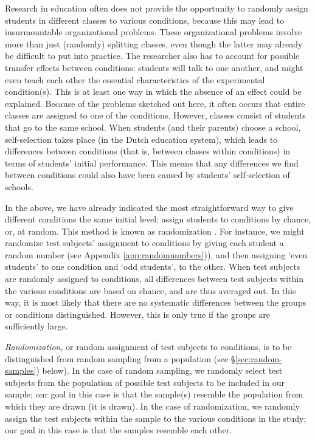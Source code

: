 \documentclass[
]{book}
\begin{document}
Research in education often does not provide the opportunity to randomly assign students in different classes to various conditions, because this may lead to insurmountable organizational problems. These organizational problems involve more than just (randomly) splitting classes, even though the latter may already be difficult to put into practice. The researcher also has to account for possible transfer effects between conditions: students will talk to one another, and might even teach each other the essential characteristics of the experimental condition(s). This is at least one way in which the absence of an effect could be explained. Because of the problems sketched out here, it often occurs that entire classes are assigned to one of the conditions. However, classes consist of students that go to the same school. When students (and their parents) choose a school, self-selection takes place (in the Dutch education system), which leads to differences between conditions (that is, between classes within conditions) in terms of students' initial performance. This means that any differences we find between conditions could also have been caused by students' self-selection of schools.

In the above, we have already indicated the most straightforward way to give different conditions the same initial level: assign students to conditions by chance, or, at random. This method is known as randomization \citep[p.294 ff]{SCC02}. For instance, we might randomize test subjects' assignment to conditions by giving each student a random number (see Appendix \ref{app:randomnumbers})), and then assigning `even students' to one condition and `odd students', to the other. When test subjects are randomly assigned to conditions, all differences between test subjects within the various conditions are based on chance, and are thus averaged out. In this way, it is most likely that there are no systematic differences between the groups or conditions distinguished. However, this is only true if the groups are sufficiently large.

\emph{Randomization}, or random assignment of test subjects to conditions, is to be distinguished from random sampling from a population (see §\ref{sec:random-samples}) below). In the case of random sampling, we randomly select test subjects from the population of possible test subjects to be included in our sample; our goal in this case is that the sample(s) resemble the population from which they are drawn (it is drawn). In the case of randomization, we randomly assign the test subjects within the sample to the various conditions in the study; our goal in this case is that the samples resemble each other.
\end{document}
